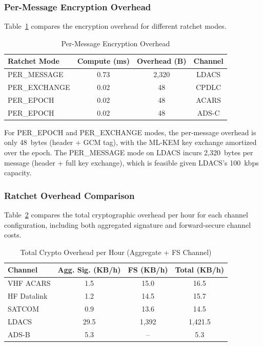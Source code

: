 \documentclass[conference,10pt]{IEEEtran}
\begin{document}
\subsubsection{Per-Message Encryption Overhead}

Table~\ref{tab:encrypt_overhead} compares the encryption overhead for different ratchet modes.

\begin{table}[t]
\centering
\caption{Per-Message Encryption Overhead}
\label{tab:encrypt_overhead}
\begin{tabular}{lccc}
\toprule
\textbf{Ratchet Mode} & \textbf{Compute (ms)} & \textbf{Overhead (B)} & \textbf{Channel} \\
\midrule
PER\_MESSAGE & 0.73 & 2,320 & LDACS \\
PER\_EXCHANGE & 0.02 & 48 & CPDLC \\
PER\_EPOCH & 0.02 & 48 & ACARS \\
PER\_EPOCH & 0.02 & 48 & ADS-C \\
\bottomrule
\end{tabular}
\end{table}

For PER\_EPOCH and PER\_EXCHANGE modes, the per-message overhead is only 48~bytes (header + GCM tag), with the ML-KEM key exchange amortized over the epoch. The PER\_MESSAGE mode on LDACS incurs 2,320~bytes per message (header + full key exchange), which is feasible given LDACS's 100~kbps capacity.

\subsubsection{Ratchet Overhead Comparison}

Table~\ref{tab:ratchet_comparison} compares the total cryptographic overhead per hour for each channel configuration, including both aggregated signature and forward-secure channel costs.

\begin{table}[t]
\centering
\caption{Total Crypto Overhead per Hour (Aggregate + FS Channel)}
\label{tab:ratchet_comparison}
\begin{tabular}{lccc}
\toprule
\textbf{Channel} & \textbf{Agg. Sig. (KB/h)} & \textbf{FS (KB/h)} & \textbf{Total (KB/h)} \\
\midrule
VHF ACARS & 1.5 & 15.0 & 16.5 \\
HF Datalink & 1.2 & 14.5 & 15.7 \\
SATCOM & 0.9 & 13.6 & 14.5 \\
LDACS & 29.5 & 1,392 & 1,421.5 \\
ADS-B & 5.3 & -- & 5.3 \\
\bottomrule
\end{tabular}
\end{table}
\end{document}
